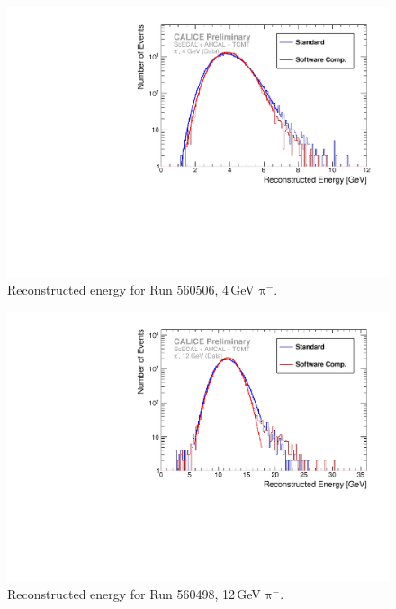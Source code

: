 \documentclass[twoside,a4paper,12pt]{article}
\newcommand\piminus{\(\mathrm{\pi^-}\)}
\begin{document}
\clearpage
\begin{figure}[htbp]
\begin{center}
\includegraphics[width=1\textwidth,page=1]{ERec_classic_SC_560506_data}
\caption{Reconstructed energy for Run 560506, 4\,GeV \piminus.}
\label{fig:erec_4gev}
\end{center}
\end{figure}

\begin{figure}[htbp]
\begin{center}
\includegraphics[width=1\textwidth,page=1]{ERec_classic_SC_560498_data}
\caption{Reconstructed energy for Run 560498, 12\,GeV \piminus.}
\label{fig:erec_12gev}
\end{center}
\end{figure}
\end{document}
